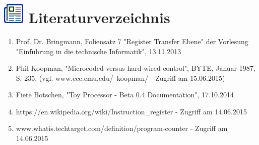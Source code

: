 \documentclass{article}
\begin{document}
\newpage

\section*{\includegraphics[width=1cm]{./icon_literatur.png}
\hspace{0.25cm} Literaturverzeichnis}
\begin{enumerate}
    \item   Prof. Dr. Bringmann, Foliensatz 7 "Register Transfer Ebene" der Vorlesung "Einführung
            in die technische Informatik", 13.11.2013
    \item   Phil Koopman, "Microcoded versus hard-wired control", BYTE,
            Januar 1987, S. 235, (vgl. www.ece.cmu.edu/~koopman/ - Zugriff am
            15.06.2015)
    \item   Fiete Botschen, "Toy Processor - Beta 0.4 Documentation",
            17.10.2014
    \item   https://en.wikipedia.org/wiki/Instruction\_register - Zugriff
            am 14.06.2015
    \item   www.whatis.techtarget.com/definition/program-counter - Zugriff
            am 14.06.2015
\end{enumerate}
\end{document}
